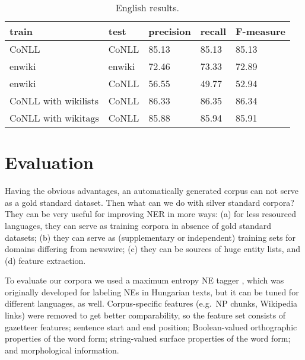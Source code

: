 \documentclass[11pt]{article}
\begin{document}
\begin{table*}[ht]
\begin{center}
\begin{tabular}{lllll}
\hline \bf train & \bf test & \bf precision & \bf recall & \bf F-measure \\ \hline
CoNLL & CoNLL & 85.13 & 85.13 & 85.13 \\
enwiki & enwiki & 72.46 & 73.33 &  72.89 \\
enwiki & CoNLL & 56.55 & 49.77 & 52.94 \\
CoNLL with wikilists & CoNLL & 86.33 & 86.35 & 86.34 \\
CoNLL with wikitags & CoNLL & 85.88 & 85.94 & 85.91 \\
\hline
\end{tabular}
\end{center}
\caption{\label{enresults} English results.}
\end{table*}

\section{Evaluation}
\label{sec:eval}

Having the obvious advantages, an automatically generated corpus can not serve as a gold standard dataset. Then what can we do with silver standard corpora? They can be very useful for improving NER in more ways: (a) for less resourced languages, they can serve as training corpora in absence of gold standard datasets; (b) they can serve as (supplementary or independent) training sets for domains differing from newswire; (c) they can be sources of huge entity lists, and (d) feature extraction. 

To evaluate our corpora we used a maximum entropy NE tagger \cite{Varga:07}, which was originally developed for labeling NEs in Hungarian texts, but it can be tuned for different languages, as well. Corpus-specific features (e.g.~NP chunks, Wikipedia links) were removed to get better comparability, so the feature set consists of gazetteer features; sentence start and end position; Boolean-valued orthographic properties of the word form; string-valued surface properties of the word form; and morphological information.

\end{document}
